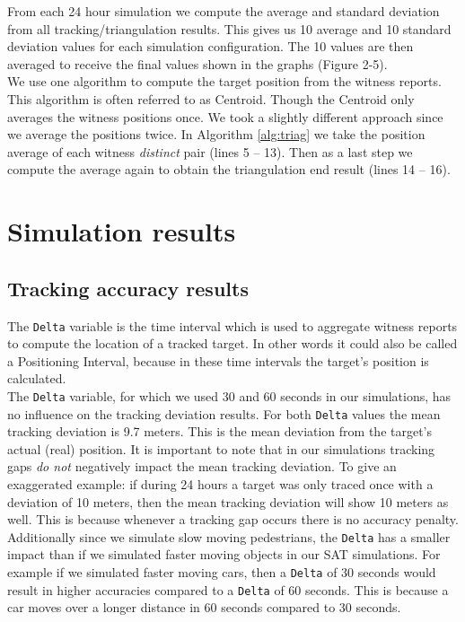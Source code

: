 \documentclass[10pt,titlepage]{article}
\begin{document}
From each 24 hour simulation we compute the average and standard deviation from all tracking/triangulation results. This gives us 10 average and 10 standard deviation values for each simulation configuration. The 10 values are then averaged to receive the final values shown in the graphs (Figure 2-5).\\




We use one algorithm to compute the target position from the witness reports. This algorithm is often referred to as Centroid. Though the Centroid only averages the witness positions once. We took a slightly different approach since we average the positions twice. In Algorithm \ref{alg:triag} we take the position average of each witness \textit{distinct} pair (lines 5 -- 13). Then as a last step we compute the average again to obtain the triangulation end result (lines 14 -- 16).\\







\section{Simulation results}
\subsection{Tracking accuracy results}
The \texttt{Delta} variable is the time interval which is used to aggregate witness reports to compute the location of a tracked target. In other words it could also be called a Positioning Interval, because in these time intervals the target's position is calculated.\\

The \texttt{Delta} variable, for which we used 30 and 60 seconds in our simulations, has no influence on the tracking deviation results. For both \texttt{Delta} values the mean tracking deviation is 9.7 meters. This is the mean deviation from the target's actual (real) position. It is important to note that in our simulations tracking gaps \textit{do not} negatively impact the mean tracking deviation. To give an exaggerated example: if during 24 hours a target was only traced once with a deviation of 10 meters, then the mean tracking deviation will show 10 meters as well. This is because whenever a tracking gap occurs there is no accuracy penalty. Additionally since we simulate slow moving pedestrians, the \texttt{Delta} has a smaller impact than if we simulated faster moving objects in our SAT simulations. For example if we simulated faster moving cars, then a \texttt{Delta} of 30 seconds would result in higher accuracies compared to a \texttt{Delta} of 60 seconds. This is because a car moves over a longer distance in 60 seconds compared to 30 seconds.\\
\end{document}

